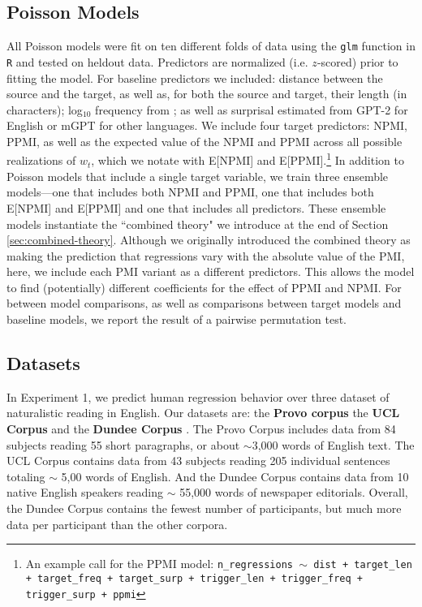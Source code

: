 \documentclass[12pt]{article}
\newcommand{\targetindex}{t}
\newcommand{\target}{$w_{\targetindex}$\xspace}
\begin{document}
\subsection{Poisson Models}

All Poisson models were fit on ten different folds of data using the \texttt{glm} function in \texttt{R} and tested on heldout data.  Predictors are normalized (i.e. $z$-scored) prior to fitting the model. For baseline predictors we included: distance between the source and the target, as well as, for both the source and target, their length (in characters);  log$_10$ frequency from \cite{speer2022wordfreq}; as well as surprisal estimated from GPT-2 \citep{radford2019language} for English or mGPT \citep{shliazhko2022mgpt} for other languages. We include four target predictors: NPMI, PPMI, as well as the expected value of the NPMI and PPMI across all possible realizations of \target, which we notate with E[NPMI] and E[PPMI].\footnote{An example call for the PPMI model: \texttt{n\_regressions $\sim$ dist + target\_len + target\_freq + target\_surp + trigger\_len + trigger\_freq + trigger\_surp + ppmi}} In addition to Poisson models that include a single target variable, we train three ensemble models---one that includes both NPMI and PPMI, one that includes both E[NPMI] and E[PPMI] and one that includes all predictors. These ensemble models instantiate the ``combined theory" we introduce at the end of Section \ref{sec:combined-theory}. Although we originally introduced the combined theory as making the prediction that regressions vary with the absolute value of the PMI, here, we include each PMI variant as a different predictors. This allows the model to find (potentially) different coefficients for the effect of PPMI and NPMI. For between model comparisons, as well as comparisons between target models and baseline models, we report the result of a pairwise permutation test.

\subsection{Datasets}

In Experiment 1, we predict human regression behavior over three dataset of naturalistic reading in English. Our datasets are: the \textbf{Provo corpus} \citep{luke2018provo} the \textbf{UCL Corpus} \citep{Frank2013ReadingTD} and the \textbf{Dundee Corpus} \citep{kennedy2003dundee}. The Provo Corpus includes data from 84 subjects reading 55 short paragraphs, or about $\sim$3,000 words of English text. The UCL Corpus contains data from 43 subjects reading 205 individual sentences totaling $\sim$ 5,00 words of English. And the Dundee Corpus contains data from 10 native English speakers reading $\sim$ 55,000 words of newspaper editorials. Overall, the Dundee Corpus contains the fewest number of participants, but much more data per participant than the other corpora.
\end{document}
